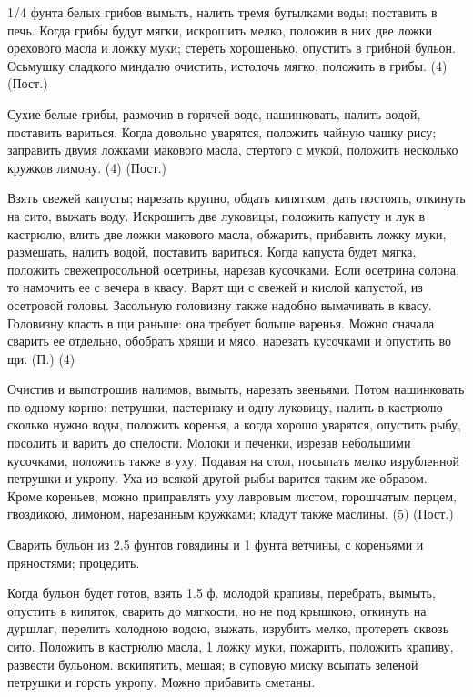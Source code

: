 
1/4 фунта белых грибов вымыть, налить тремя бутылками воды; поставить в печь. Когда грибы будут мягки, искрошить мелко, положив в них две ложки орехового масла и ложку муки; стереть хорошенько, опустить в грибной бульон. Осьмушку сладкого миндалю очистить, истолочь мягко, положить в грибы. (4) (Пост.)


Сухие белые грибы, размочив в горячей воде, нашинковать, налить водой, поставить вариться. Когда довольно уварятся, положить чайную чашку рису; заправить двумя ложками макового масла, стертого с мукой, положить несколько кружков лимону. (4) (Пост.)


Взять свежей капусты; нарезать крупно, обдать кипятком, дать постоять, откинуть на сито, выжать воду. Искрошить две луковицы, положить капусту и лук в кастрюлю, влить две ложки макового масла, обжарить, прибавить ложку муки, размешать, налить водой, поставить вариться. Когда капуста будет мягка, положить свежепросольной осетрины, нарезав кусочками. Если осетрина солона, то намочить ее с вечера в квасу. Варят щи с свежей и кислой капустой, из осетровой головы. Засольную головизну также надобно вымачивать в квасу. Головизну класть в щи раньше: она требует больше варенья. Можно сначала сварить ее отдельно, обобрать хрящи и мясо, нарезать кусочками и опустить во щи. (П.) (4)


Очистив и выпотрошив налимов, вымыть, нарезать звеньями. Потом нашинковать по одному корню: петрушки, пастернаку и одну луковицу, налить в кастрюлю сколько нужно воды, положить коренья, а когда хорошо уварятся, опустить рыбу, посолить и варить до спелости. Молоки и печенки, изрезав небольшими кусочками, положить также в уху. Подавая на стол, посыпать мелко изрубленной петрушки и укропу. Уха из всякой другой рыбы варится таким же образом. Кроме кореньев, можно приправлять уху лавровым листом, горошчатым перцем, гвоздикою, лимоном, нарезанным кружками; кладут также маслины. (5) (Пост.)


Сварить бульон из 2.5 фунтов говядины и 1 фунта ветчины, с кореньями и пряностями; процедить.

Когда бульон будет готов, взять 1.5 ф. молодой крапивы, перебрать, вымыть, опустить в кипяток, сварить до мягкости, но не под крышкою, откинуть на дуршлаг, перелить холодною водою, выжать, изрубить мелко, протереть сквозь сито. Положить в кастрюлю масла, 1 ложку муки, пожарить, положить крапиву, развести бульоном. вскипятить, мешая; в суповую миску всыпать зеленой петрушки и горсть укропу. Можно прибавить сметаны.

